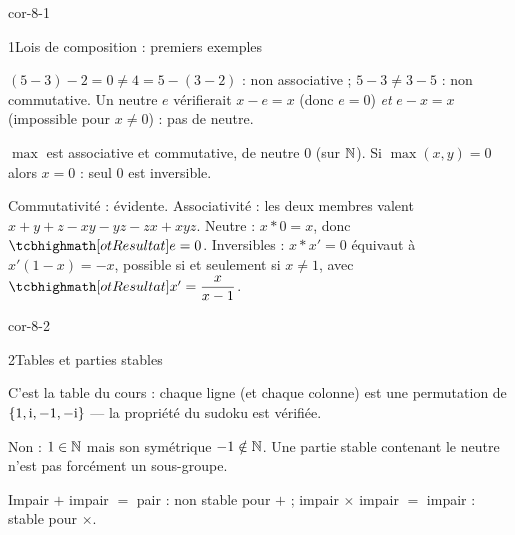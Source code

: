 
\corrigesSouples

\begin{blocLivre}{cor-8-1}
\begin{corrige}{1}{Lois de composition : premiers exemples}
\begin{questions}
  \item $(5-3)-2=0\neq4=5-(3-2)$ : non associative ; $5-3\neq3-5$ : non
    commutative. Un neutre $e$ vérifierait $x-e=x$ (donc $e=0$) \emph{et}
    $e-x=x$ (impossible pour $x\neq0$) : pas de neutre.
  \item $\max$ est associative et commutative, de neutre $0$ (sur $\mathbb{N}$).
    Si $\max(x,y)=0$ alors $x=0$ : seul $0$ est inversible.
  \item Commutativité : évidente. Associativité : les deux membres valent
    $x+y+z-xy-yz-zx+xyz$. Neutre : $x*0=x$, donc $\res{e=0}$.
    Inversibles : $x*x'=0$ équivaut à $x'(1-x)=-x$, possible si et
    seulement si $x\neq1$, avec $\res{x'=\dfrac{x}{x-1}}$.
\end{questions}
\end{corrige}
\end{blocLivre}

\begin{blocLivre}{cor-8-2}
\begin{corrige}{2}{Tables et parties stables}
\begin{questions}
  \item C'est la table du cours : chaque ligne (et chaque colonne) est une
    permutation de $\left\{1,\mathrm{i},-1,-\mathrm{i}\right\}$ — la propriété du
    sudoku est vérifiée.
  \item Non : $1\in\mathbb{N}$ mais son symétrique $-1\notin\mathbb{N}$. Une partie stable
    contenant le neutre n'est pas forcément un sous-groupe.
  \item Impair $+$ impair $=$ pair : non stable pour $+$ ; impair
    $\times$ impair $=$ impair : stable pour $\times$.
\end{questions}
\end{corrige}
\end{blocLivre}

